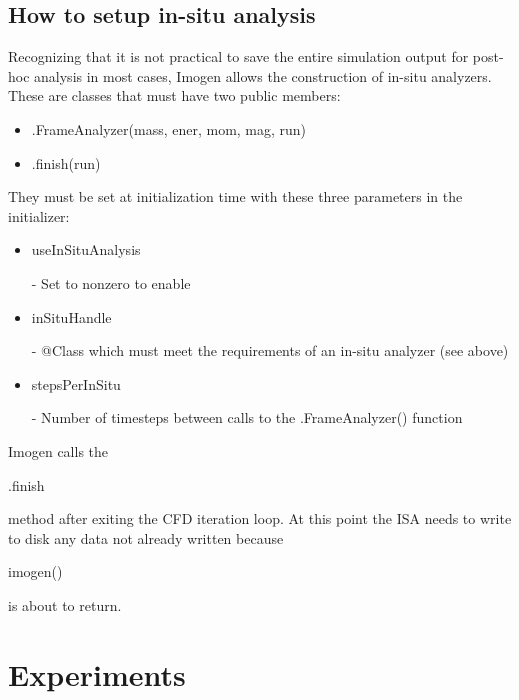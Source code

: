 \documentclass[letterpaper,12pt]{article}
\begin{document}
\subsection{How to setup in-situ analysis}

Recognizing that it is not practical to save the entire simulation output for post-hoc analysis in
most cases, Imogen allows the construction of in-situ analyzers. These are classes that must have
two public members:
\begin{itemize}
\item \begin{tt}.FrameAnalyzer(mass, ener, mom, mag, run)\end{tt}
\item \begin{tt}.finish(run)\end{tt}
\end{itemize}

They must be set at initialization time with these three parameters in the initializer:
\begin{itemize}
\item \begin{tt}useInSituAnalysis\end{tt} - Set to nonzero to enable
\item \begin{tt}inSituHandle\end{tt} - @Class which must meet the requirements of an
in-situ analyzer (see above)
\item \begin{tt}stepsPerInSitu\end{tt} - Number of timesteps between calls to the .FrameAnalyzer() function
\end{itemize}

Imogen calls the \begin{tt}.finish\end{tt} method after exiting the CFD iteration loop. At this point the
ISA needs to write to disk any data not already written because \begin{tt}imogen()\end{tt} is about to 
return.

\section{Experiments}
















\end{document}
